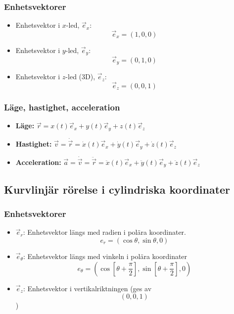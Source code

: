 \documentclass{article}
\newenvironment{ankiflashcard}[1]{}{}
\begin{document}
\begin{paracol}{2}
\subsubsection{Enhetsvektorer}
\begin{itemize}
    \item Enhetsvektor i $x$-led, $\vec e_x$:
    $$\vec e_x = (1,0,0)$$
    \item Enhetsvektor i $y$-led, $\vec e_y$:
    $$\vec e_y = (0,1,0)$$
    \item Enhetsvektor i $z$-led (3D), $\vec e_z$:
    $$\vec e_z = (0,0,1)$$ 
\end{itemize}
\subsubsection{Läge, hastighet, acceleration}

\begin{ankiflashcard}{Definera läge, hastighet och acceleration i kartesiska koordinater.}
    
\begin{itemize}
    \item \textbf{Läge:} $\vec r = x(t)\vec e_x + y(t)\vec e_y + z(t)\vec e_z$
    \item \textbf{Hastighet:} $\vec v = \dot{\vec r} = \dot x(t)\vec e_x + \dot y(t)\vec e_y + \dot z(t)\vec e_z$
    \item \textbf{Acceleration:} $\vec a = \dot{\vec v} = \ddot{\vec r} = \ddot x(t)\vec e_x + \ddot y(t)\vec e_y + \ddot z(t)\vec e_z$
\end{itemize}
\end{ankiflashcard}

\subsection{Kurvlinjär rörelse i cylindriska koordinater}

\begin{ankiflashcard}{Definiera enhetsvektorerna i cylinderkoordinater.}
\subsubsection{Enhetsvektorer}

\begin{itemize}
    \item $\vec e_r$: Enhetsvektor längs med radien i polära koordinater.
    $$e_r = (\cos \theta, \sin \theta, 0)$$
    \item $\vec e_\theta$: Enhetsvektor längs med vinkeln i polära koordinater
    $$e_\theta = (\cos \left[\theta + \frac{\pi}{2}\right], \sin \left[\theta + \frac{\pi}{2}\right], 0)$$
    \item $\vec e_z$: Enhetsvektor i vertikalriktningen (ges av $$(0,0,1)$$)
\end{itemize}
\end{ankiflashcard}


\end{paracol}
\end{document}

